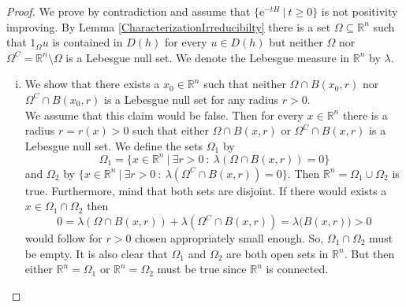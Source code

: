 \documentclass[10pt,a4paper]{amsart}
\def\R{\mathbb{R}}
\begin{document}
\begin{proof}
We prove by contradiction and assume that $\{ \mathrm{e}^{-tH} \ | \  t \geq 0 \}$ is not positivity improving. 
By Lemma \ref{CharacterizationIrreducibilty} there is a set $\Omega \subseteq \R^{n}$ such that  
$1_{\Omega} u$  is contained in $D(h)$ for every $u \in D(h)$ but neither $\Omega$ nor 
$\Omega^{C}  = \R^{n} \setminus \Omega$ is a Lebesgue null set. We denote the Lebesgue measure in 
$\R^{n}$ by $\lambda$.\\

\begin{enumerate}[i.)]
\item We show that there exists a $x_{0} \in \R^{n}$ such that neither $\Omega \cap B(x_{0},r)$ nor 
$\Omega^{C} \cap B(x_{0},r)$ is a Lebesgue null set for any radius $r>0$.\\

We assume that this claim would be false. Then for every $x \in \R^{n}$ there is a radius $r=r(x) > 0$ such that either
$\Omega \cap B(x,r)$ or $\Omega^{C} \cap B(x,r)$ is a Lebesgue null set. We define the sets $\Omega_{1}$ by
$$
\Omega_{1} = \{ x \in \R^{n} \ | \ \exists r > 0 \ : \ \lambda(\Omega \cap B(x,r)) = 0 \}
$$
and $\Omega_{2}$ by $\{ x \in \R^{n} \ | \ \exists r > 0 \ : \ \lambda(\Omega^{C} \cap B(x,r)) = 0 \}$. Then 
$\R^{n} = \Omega_{1} \cup \Omega_{2}$ is true. Furthermore, mind that both sets 
are disjoint. If there would exists a $x \in \Omega_{1} \cap \Omega_{2}$ then
$$
0  = \lambda(\Omega \cap B(x,r)) + \lambda(\Omega^{C} \cap B(x,r)) = \lambda \bigl( B(x,r) \bigr) > 0
$$
would follow for $r>0$ chosen appropriately small enough. So, $\Omega_{1} \cap \Omega_{2}$ must be empty. 
It is also clear that $\Omega_{1}$ and $\Omega_{2}$ are 
both open sets in $\R^{n}$. But then either $\R^{n} = \Omega_{1}$ or $\R^{n} = \Omega_{2}$ must be true since $\R^{n}$
is connected.\\


\end{enumerate}
\end{proof}
\end{document}
